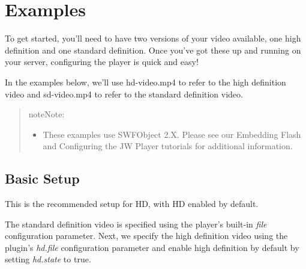 \documentclass[letterpaper,10pt,english]{sphinxmanual}
\begin{document}
\chapter{Examples}
\label{index:examples}
To get started, you'll need to have two versions of your video available, one high definition and one standard definition. Once you've got these up and running on your server, configuring the player is quick and easy!

In the examples below, we'll use hd-video.mp4 to refer to the high definition video and sd-video.mp4 to refer to the standard definition video.
\begin{quote}

\begin{notice}{note}{Note:}\begin{itemize}
\item {} 
These examples use SWFObject 2.X. Please see our Embedding Flash and Configuring the JW Player tutorials for additional information.

\end{itemize}
\end{notice}
\end{quote}


\section{Basic Setup}
\label{index:basic-setup}
This is the recommended setup for HD, with HD enabled by default.

The standard definition video is specified using the player's built-in \emph{file} configuration parameter. Next, we specify the high definition video using the plugin's \emph{hd.file} configuration parameter and enable high definition by default by setting \emph{hd.state} to true.
\end{document}
